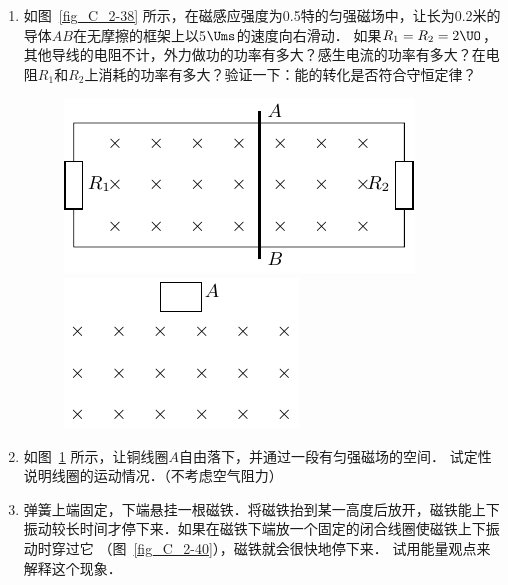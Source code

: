 \begin{enumerate}
    \item 如图~\ref{fig_C_2-38} 所示，在磁感应强度为0.5特的匀强磁场中，让长为0.2米的导体$AB$在无摩擦的框架上以5$\Ums$的速度向右滑动．
    如果$R_1=R_2=2\UO$，其他导线的电阻不计，外力做功的功率有多大？感生电流的功率有多大？在电阻$R_1$和$R_2$上消耗的功率有多大？验证一下：能的转化是否符合守恒定律？
    \begin{figure}[htbp]
    	\centering
    	\begin{minipage}[t]{0.48\textwidth}
    		\centering
    		\includegraphics{fig/C/2-38.pdf}
    		\caption{}\label{fig_C_2-38}
    	\end{minipage}
    	\begin{minipage}[t]{0.48\textwidth}
    		\centering
    		\includegraphics{fig/C/2-39.pdf}
    		\caption{}\label{fig_C_2-39}
    	\end{minipage}
    \end{figure}
\item 如图~\ref{fig_C_2-39} 所示，让铜线圈$A$自由落下，并通过一段有匀强磁场的空间．
试定性说明线圈的运动情况．（不考虑空气阻力）

\item 弹簧上端固定，下端悬挂一根磁铁．将磁铁抬到某一高度后放开，磁铁能上下振动较长时间才停下来．如果在磁铁下端放一个固定的闭合线圈使磁铁上下振动时穿过它
（图~\ref{fig_C_2-40}），磁铁就会很快地停下来．
试用能量观点来解释这个现象．



\end{enumerate}
